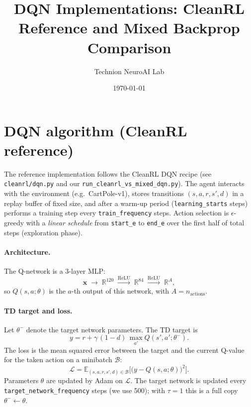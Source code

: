 \documentclass[11pt]{article}
\title{DQN Implementations: CleanRL Reference and Mixed Backprop Comparison}
\author{Technion NeuroAI Lab}
\date{\today}
\begin{document}
\maketitle

\section{DQN algorithm (CleanRL reference)}

The reference implementation follows the CleanRL DQN recipe (see \texttt{cleanrl/dqn.py} and our \texttt{run\_cleanrl\_vs\_mixed\_dqn.py}). The agent interacts with the environment (e.g.\ CartPole-v1), stores transitions $(s, a, r, s', d)$ in a replay buffer of fixed size, and after a warm-up period (\texttt{learning\_starts} steps) performs a training step every \texttt{train\_frequency} steps. Action selection is $\epsilon$-greedy with a \emph{linear schedule} from \texttt{start\_e} to \texttt{end\_e} over the first half of total steps (exploration phase).

\paragraph{Architecture.} The Q-network is a 3-layer MLP:
\begin{equation}
\mathbf{x} \;\longrightarrow\; \mathbb{R}^{120} \;\stackrel{\mathrm{ReLU}}{\longrightarrow}\; \mathbb{R}^{84} \;\stackrel{\mathrm{ReLU}}{\longrightarrow}\; \mathbb{R}^A,
\end{equation}
so $Q(s,a;\theta)$ is the $a$-th output of this network, with $A = n_{\text{actions}}$.

\paragraph{TD target and loss.} Let $\theta^-$ denote the target network parameters. The TD target is
\begin{equation}
y = r + \gamma\,(1-d)\,\max_{a'} Q(s', a'; \theta^-).
\end{equation}
The loss is the mean squared error between the target and the current Q-value for the taken action on a minibatch $\mathcal{B}$:
\begin{equation}
\mathcal{L} = \mathbb{E}_{(s,a,r,s',d) \in \mathcal{B}}\bigl[ \bigl( y - Q(s,a;\theta) \bigr)^2 \bigr].
\end{equation}
Parameters $\theta$ are updated by Adam on $\mathcal{L}$. The target network is updated every \texttt{target\_network\_frequency} steps (we use 500); with $\tau=1$ this is a full copy $\theta^- \leftarrow \theta$.
\end{document}
